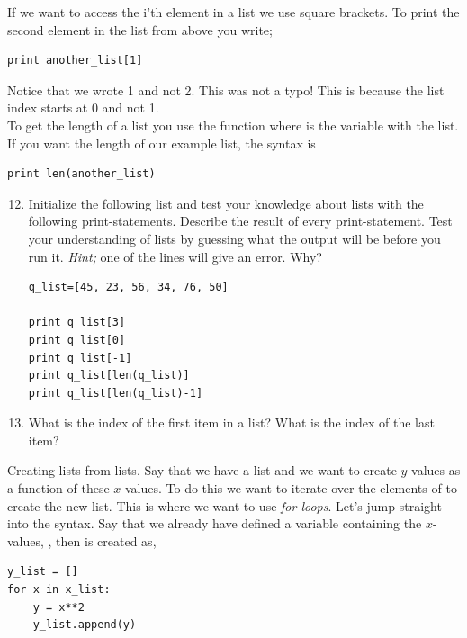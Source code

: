 \documentclass{article}
\begin{document}
If we want to access the i'th element in a list
we use square brackets. To print the second element
in the list from above you write;

\begin{lstlisting}
print another_list[1]
\end{lstlisting}

Notice that we wrote 1 and not 2. This was not a typo!
This is because the list index starts at 0 and not 1.\\

To get the length of a list you use the function 
where  is the variable with the list.
If you want the length of our example list, the syntax is

\begin{lstlisting}
print len(another_list)
\end{lstlisting}


\begin{enumerate}
  \setcounter{enumi}{11}
  \item Initialize the following list and test your knowledge about
    lists with the following print-statements.
    Describe the result of every print-statement. Test your
    understanding of lists by guessing what the output will be before
    you run it. 
    {\em Hint;} one of the lines will give an error. Why?

\begin{lstlisting}
q_list=[45, 23, 56, 34, 76, 50]

print q_list[3]
print q_list[0]
print q_list[-1]
print q_list[len(q_list)]
print q_list[len(q_list)-1]
\end{lstlisting}

  \item What is the index of the first item in a list? What is the index of
    the last item?

\end{enumerate}

Creating lists from lists. Say that we have a list 
and we want to create $y$ values as a function of these $x$ values.
To do this we want to iterate over the elements of  to create the new list.
This is where we want to use {\em for-loops}.
Let's jump straight into the syntax. Say that we already
have defined a variable containing the $x$-values, ,
then  is created as,

\begin{lstlisting}
y_list = []
for x in x_list:
    y = x**2
    y_list.append(y)
\end{lstlisting}
\end{document}
